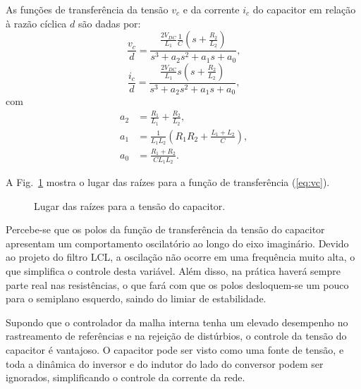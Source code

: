   As funções de transferência da tensão $v_c$ e da corrente $i_c$ do capacitor em relação à razão cíclica $d$ são dadas por:
  \begin{equation}
    \frac{v_c}{d} = \frac{\frac{2V_{DC}}{L_1} \frac{1}{C}
    	\left( s + \frac{R_2}{L_2} \right)}{s^3 + a_2 s^2 + a_1 s + a_0} \text{,}
    \label{eq:vc}
  \end{equation}
  \begin{equation}
    \frac{i_c}{d} = \frac{\frac{2V_{DC}}{L_1} s
    	\left( s + \frac{R_2}{L_2} \right)}{s^3 + a_2 s^2 + a_1 s + a_0} \text{,}
    \label{eq:ic}
  \end{equation}
  com
  \begin{equation}
  	\begin{split}
      a_2 & = \frac{R_1}{L_1} + \frac{R_2}{L_2} \text{,} \\
      a_1 & = \frac{1}{L_1 L_2} \left( R_1 R_2
      	+ \frac{L_1 + L_2}{C} \right) \text{,} \\
      a_0 & = \frac{R_1 + R_2}{C L_1 L_2} \text{.}
    \end{split}
  \end{equation}

  A Fig.~\ref{fig:rlocus_vc} mostra o lugar das raízes para a função de transferência (\ref{eq:vc}).

  \begin{figure}[htb]
    \centering{
      }
    \renewcommand\figurename{Fig.}
    \caption{Lugar das raízes para a tensão do capacitor.}
    \label{fig:rlocus_vc}
  \end{figure}

  Percebe-se que os polos da função de transferência da tensão do capacitor apresentam um comportamento oscilatório ao longo do eixo imaginário. Devido ao projeto do filtro LCL, a oscilação não ocorre em uma frequência muito alta, o que simplifica o controle desta variável. Além disso, na prática haverá sempre parte real nas resistências, o que fará com que os polos desloquem-se um pouco para o semiplano esquerdo, saindo do limiar de estabilidade.

  Supondo que o controlador da malha interna tenha um elevado desempenho no rastreamento de referências e na rejeição de distúrbios, o controle da tensão do capacitor é vantajoso. O capacitor pode ser visto como uma fonte de tensão, e toda a dinâmica do inversor e do indutor do lado do conversor podem ser ignorados, simplificando o controle da corrente da rede.

